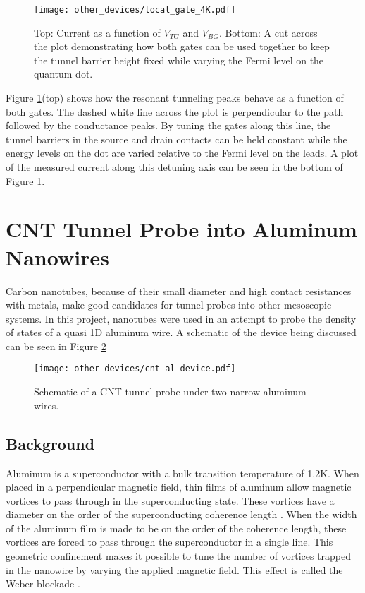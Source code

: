 \begin{figure}
    \centering
    \texttt{[image: other\_devices/local\_gate\_4K.pdf]}
    \caption{Top: Current as a function of $V_{TG}$ and $V_{BG}$. Bottom: A cut across the plot demonstrating how both gates can be used together to keep the tunnel barrier height fixed while varying the Fermi level on the quantum dot.}
    \label{fig:local_gate_4K}
\end{figure}

Figure \ref{fig:local_gate_4K}(top) shows how the resonant tunneling peaks behave as a function of both gates. The dashed white line across the plot is perpendicular to the path followed by the conductance peaks. By tuning the gates along this line, the tunnel barriers in the source and drain contacts can be held constant while the energy levels on the dot are varied relative to the Fermi level on the leads. A plot of the measured current along this detuning axis can be seen in the bottom of Figure \ref{fig:local_gate_4K}.

\section{CNT Tunnel Probe into Aluminum Nanowires}

Carbon nanotubes, because of their small diameter and high contact resistances with metals, make good candidates for tunnel probes into other mesoscopic systems. In this project, nanotubes were used in an attempt to probe the density of states of a quasi 1D aluminum wire. A schematic of the device being discussed can be seen in Figure \ref{fig:cnt_al_device}

\begin{figure}
    \centering
    \texttt{[image: other\_devices/cnt\_al\_device.pdf]}
    \caption{Schematic of a CNT tunnel probe under two narrow aluminum wires.}
    \label{fig:cnt_al_device}
\end{figure}

\subsection{Background}

Aluminum is a superconductor with a bulk transition temperature of 1.2K. When placed in a perpendicular magnetic field, thin films of aluminum allow magnetic vortices to pass through in the superconducting state. These vortices have a diameter on the order of the superconducting coherence length \cite{Tinkham1996}. When the width of the aluminum film is made to be on the order of the coherence length, these vortices are forced to pass through the superconductor in a single line. This geometric confinement makes it possible to tune the number of vortices trapped in the nanowire by varying the applied magnetic field. This effect is called the Weber blockade \cite{Pekker2011}.

